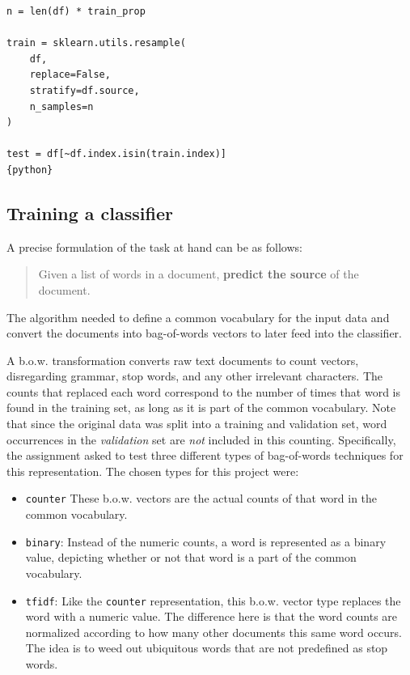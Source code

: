 \begin{verbatim}
n = len(df) * train_prop

train = sklearn.utils.resample(
    df,
    replace=False,
    stratify=df.source,
    n_samples=n
)

test = df[~df.index.isin(train.index)]
{python}\end{verbatim}

\subsection{Training a classifier}
\label{chap:Training a classifier}

\quad A precise formulation of the task at hand can be as follows:

\begin{quote}
    Given a list of words in a document, \textbf{predict the source} of the document. 
\end{quote} 

The algorithm needed to define a common vocabulary for the input data and convert the documents into bag-of-words vectors to later feed into the classifier. 

A b.o.w. transformation converts raw text documents to count vectors, disregarding grammar, stop words, and any other irrelevant characters. The counts that replaced each word correspond to the number of times that word is found in the training set, as long as it is part of the common vocabulary. Note that since the original data was split into a training and validation set, word occurrences in the \textit{validation} set are \textit{not} included in this counting. 
\newline
Specifically, the assignment asked to test three different types of bag-of-words techniques for this representation. The chosen types for this project were:

\begin{itemize}
\item \texttt{counter} These b.o.w. vectors are the actual counts of that word in the common vocabulary.

\item \texttt{binary}: Instead of the numeric counts, a word is represented as a binary value, depicting whether or not that word is a part of the common vocabulary.

\item \texttt{tfidf}: Like the \texttt{counter} representation, this b.o.w. vector type replaces the word with a numeric value. The difference here is that the word counts are normalized according to how many other documents this same word occurs. The idea is to weed out ubiquitous words that are not predefined as stop words. 
\end{itemize}

